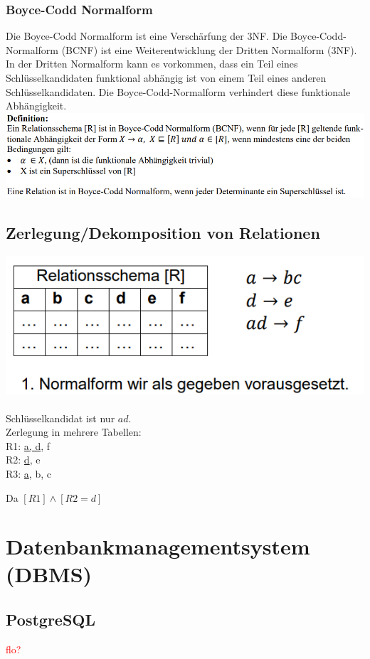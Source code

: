 \documentclass[12pt,a4paper]{article}
\begin{document}
	\subsubsection{Boyce-Codd Normalform}
		Die Boyce-Codd Normalform ist eine Verschärfung der 3NF. Die Boyce-Codd-Normalform (BCNF) ist eine Weiterentwicklung der Dritten Normalform (3NF). In der Dritten Normalform kann es vorkommen, dass ein Teil eines Schlüsselkandidaten funktional abhängig ist von einem Teil eines anderen Schlüsselkandidaten. Die Boyce-Codd-Normalform verhindert diese funktionale Abhängigkeit. \\
		\includegraphics[width=\textwidth]{Bilder/boyce_codd.PNG}

	\subsection{Zerlegung/Dekomposition von Relationen}
		\includegraphics*[scale=1]{Bilder/RelSchema.png}\\\\
		Schlüsselkandidat ist nur $ad$.\\
		Zerlegung in mehrere Tabellen:\\
		R1: \underline{a, d}, f\\
		R2: \underline{d}, e\\
		R3: \underline{a}, b, c

		Da $[R1] \wedge [R2 = d]$ 

\section{Datenbankmanagementsystem (DBMS)}
	\subsection{PostgreSQL}
		\textcolor{red}{flo?}
\end{document}

